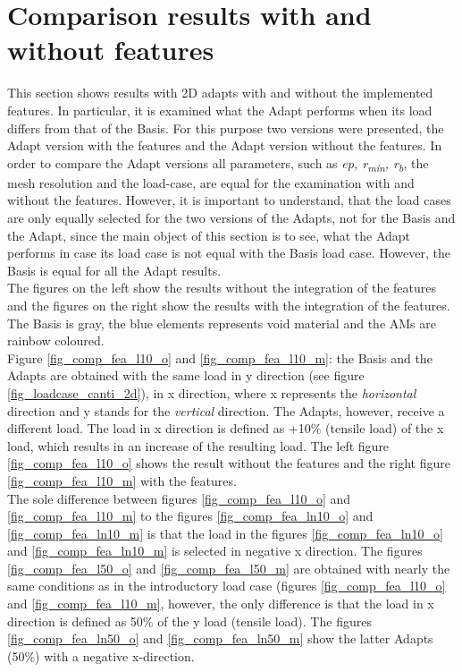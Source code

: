    
\section{Comparison results with and without features}
\label{section_compare_results_with_without_feature}

This section shows results with 2D adapts
 with and without the implemented features.
 In particular, it is examined what the Adapt
  performs when its load differs from that of the Basis. 
  For this purpose two versions were presented, 
  the Adapt version with the 
  features and the Adapt version without the features. 
 In order to compare the Adapt versions
  all parameters, such as \textit{ep, r\textsubscript{min}, r\textsubscript{b}},
 the  mesh resolution and the load-case, 
  are equal for the examination with and without the 
  features. However, it is important to understand,
  that the load cases are only equally selected 
  for the two versions of the Adapts, not 
  for the Basis and the Adapt, since the main
  object of this section is to see, what
  the Adapt performs in case its load
  case is not equal with the
  Basis load case. However, the Basis is equal
  for all the Adapt results.\\
  
 The figures on the left show the results without
   the integration of the features and the figures on the
    right show the results with the integration of the features.
    The Basis is gray, the blue elements
    represents void material and the AMs are
    rainbow coloured.\\
    
Figure \ref{fig_comp_fea_l10_o} and \ref{fig_comp_fea_l10_m}: 
 the Basis and the Adapts are obtained with the 
same load in y direction (see figure \ref{fig_loadcase_canti_2d}),
 in x direction, where x represents the
 \emph{horizontal} direction and y stands for
 the \emph{vertical} direction. 
 The Adapts, however, receive a different load. 
The load in x direction is defined as +10\% (tensile load) of the x load,
which results in an increase of the resulting load.
The left figure \ref{fig_comp_fea_l10_o}  shows the result
 without the features and the right figure 
 \ref{fig_comp_fea_l10_m} with the features.\\
 
The sole difference 
between figures \ref{fig_comp_fea_l10_o} and 
\ref{fig_comp_fea_l10_m} to
the figures \ref{fig_comp_fea_ln10_o} and \ref{fig_comp_fea_ln10_m} 
is that the load in the figures
\ref{fig_comp_fea_ln10_o} and
\ref{fig_comp_fea_ln10_m}
 is selected in negative x direction.
 The figures \ref{fig_comp_fea_l50_o} and
\ref{fig_comp_fea_l50_m} are obtained with nearly the same
conditions as in the introductory load case
(figures \ref{fig_comp_fea_l10_o} 
and \ref{fig_comp_fea_l10_m},
 however, the only
difference is that the load in x direction is defined as 50\% of the y load
(tensile load).
 The figures \ref{fig_comp_fea_ln50_o} and
\ref{fig_comp_fea_ln50_m} show the latter Adapts (50\%)
with a negative x-direction. \\

